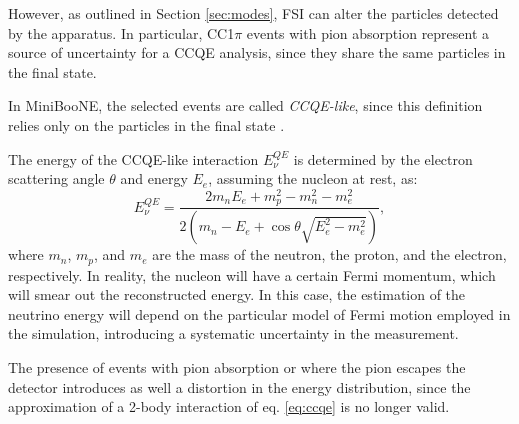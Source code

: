 However, as outlined in Section \ref{sec:modes}, FSI can alter the particles detected by the apparatus. In particular, CC1$\pi$ events with pion absorption represent a source of uncertainty for a CCQE analysis, since they share the same particles in the final state.

In MiniBooNE, the selected events are called \emph{CCQE-like}, since this definition relies only on the particles in the final state \cite{Katori:2013nca}. 

The energy of the CCQE-like interaction $E_{\nu}^{QE}$ is determined by the electron scattering angle $\theta$ and energy $E_e$, assuming the nucleon at rest, as:
\begin{equation}
    E_{\nu}^{QE} = \frac{2m_n E_e + m_p^2- m_n^2 - m_e^2}{2(m_n - E_e + \cos\theta\sqrt{E_e^2-m_e^2})},\label{eq:ccqe}
\end{equation}
where $m_n$, $m_p$, and $m_e$ are the mass of the neutron, the proton, and the electron, respectively. 
In reality, the nucleon will have a certain Fermi momentum, which will smear out the reconstructed energy. In this case, the estimation of the neutrino energy will depend on the particular model of Fermi motion employed in the simulation, introducing a systematic uncertainty in the measurement.

The presence of events with pion absorption or where the pion escapes the detector introduces as well a distortion in the energy distribution, since the approximation of a 2-body interaction of eq. \ref{eq:ccqe} is no longer valid.



